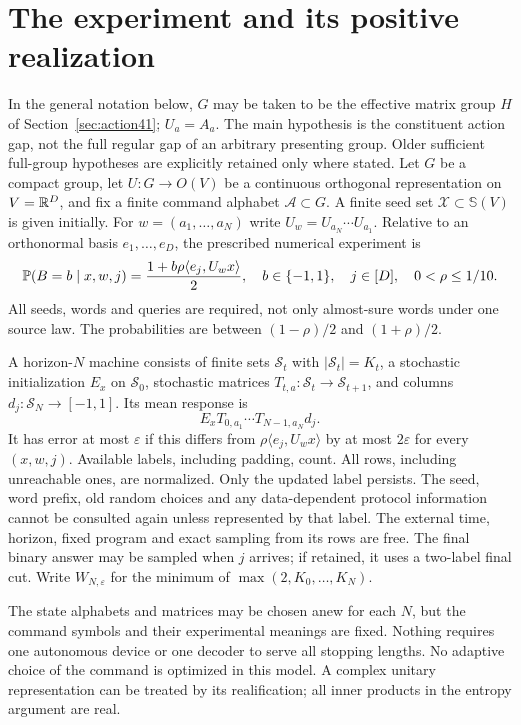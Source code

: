 \section{The experiment and its positive realization}\label{sec:model}
In the general notation below, $G$ may be taken to be the effective
matrix group $H$ of Section~\ref{sec:action41}; $U_a=A_a$. The main
hypothesis is the constituent action gap, not the full regular gap of
an arbitrary presenting group. Older sufficient full-group hypotheses
are explicitly retained only where stated.
Let $G$ be a compact group, let $U:G\to O(V)$ be a continuous orthogonal
representation on $V=\mathbb R^D$, and fix a finite command alphabet
$\mathcal A\subset G$. A finite seed set $\mathcal X\subset\mathbb S(V)$
is given initially. For $w=(a_1,\ldots,a_N)$ write
$U_w=U_{a_N}\cdots U_{a_1}$. Relative to an orthonormal basis
$e_1,\ldots,e_D$, the prescribed numerical experiment is
\begin{equation}\label{eq:law}
 \mathbb P(B=b\mid x,w,j)=\frac{1+b\rho\langle e_j,U_wx\rangle}{2},
 \quad b\in\{-1,1\},\quad j\in[D],\quad0<\rho\le1/10.
\end{equation}
All seeds, words and queries are required, not only almost-sure words
under one source law. The probabilities are between $(1-\rho)/2$ and
$(1+\rho)/2$.

\begin{definition}\label{def:machine}
A horizon-$N$ machine consists of finite sets $\mathcal S_t$ with
$|\mathcal S_t|=K_t$, a stochastic initialization $E_x$ on $\mathcal S_0$,
stochastic matrices $T_{t,a}:\mathcal S_t\to\mathcal S_{t+1}$, and
columns $d_j:\mathcal S_N\to[-1,1]$. Its mean response is
\begin{equation}\label{eq:machine}
 E_xT_{0,a_1}\cdots T_{N-1,a_N}d_j.
\end{equation}
It has error at most $\varepsilon$ if this differs from
$\rho\langle e_j,U_wx\rangle$ by at most $2\varepsilon$ for every
$(x,w,j)$. Available labels, including padding, count. All rows, including
unreachable ones, are normalized. Only the updated label persists.
The seed, word prefix, old random choices and any data-dependent protocol
information cannot be consulted again unless represented by that label.
The external time, horizon, fixed program and exact sampling from its
rows are free. The final binary answer may be sampled when $j$ arrives;
if retained, it uses a two-label final cut. Write $W_{N,\varepsilon}$ for
the minimum of $\max(2,K_0,\ldots,K_N)$.
\end{definition}
The state alphabets and matrices may be chosen anew for each $N$, but the
command symbols and their experimental meanings are fixed. Nothing
requires one autonomous device or one decoder to serve all stopping
lengths. No adaptive choice of the command is optimized in this model.
A complex unitary representation can be treated by its realification;
all inner products in the entropy argument are real.

